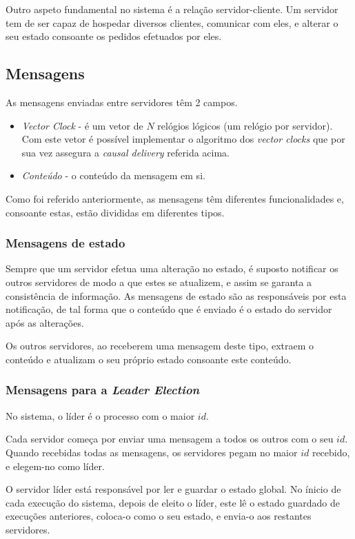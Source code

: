\documentclass[12pt, a4paper]{report}
\begin{document}
Outro aspeto fundamental no sistema é a relação servidor-cliente. 
Um servidor tem de ser capaz de hospedar diversos clientes, comunicar com eles, e alterar o seu estado consoante os pedidos efetuados por eles.


\subsection{Mensagens}
As mensagens enviadas entre servidores têm 2 campos.
\begin{itemize}
    \item \textit{Vector Clock} - é um vetor de $N$ relógios lógicos (um relógio por servidor). Com este vetor é possível implementar o algoritmo dos \textit{vector clocks} que por sua vez assegura a \textit{causal delivery} referida acima.
    \item \textit{Conteúdo} - o conteúdo da mensagem em si.
\end{itemize}

Como foi referido anteriormente, as mensagens têm diferentes funcionalidades e, consoante estas, estão divididas em diferentes tipos.

\subsubsection{Mensagens de estado}
Sempre que um servidor efetua uma alteração no estado, é suposto notificar os outros servidores de modo a que estes se atualizem, e assim se garanta a consistência de informação.
As mensagens de estado são as responsáveis por esta notificação, de tal forma que o conteúdo que é enviado é o estado do servidor após as alterações.

Os outros servidores, ao receberem uma mensagem deste tipo, extraem o conteúdo e atualizam o seu próprio estado consoante este conteúdo.


\subsubsection{Mensagens para a \textit{Leader Election}}
No sistema, o líder é o processo com o maior $id$.

Cada servidor começa por enviar uma mensagem a todos os outros com o seu $id$.
Quando recebidas todas as mensagens, os servidores pegam no maior $id$ recebido, e elegem-no como líder.

O servidor líder está responsável por ler e guardar o estado global. No ínicio de cada execução do sistema, depois de eleito o líder, este lê o estado guardado de execuções anteriores, coloca-o como o seu estado, e envia-o aos restantes servidores.
\end{document}
